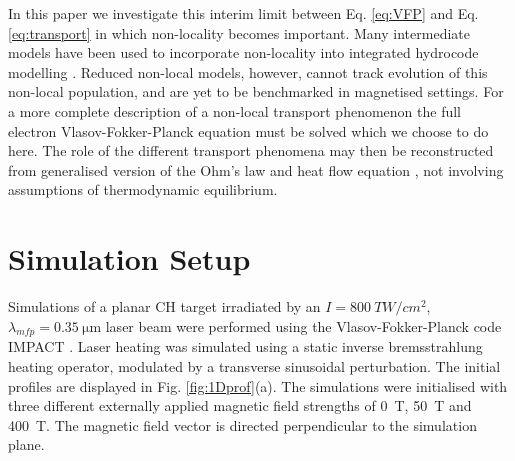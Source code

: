 \documentclass[aip,reprint]{revtex4-1}
\begin{document}
 In this paper we investigate this interim limit between Eq. \ref{eq:VFP} and Eq. \ref{eq:transport} in which non-locality becomes important. Many intermediate models have been used to incorporate non-locality into integrated hydrocode modelling \cite{Schurtz2000,Nicolai2006a,Manheimer2008}. Reduced non-local models, however, cannot track evolution of this non-local population, and are yet to be benchmarked in magnetised settings.  For a more complete description of a non-local transport phenomenon the full electron Vlasov-Fokker-Planck equation must be solved which we choose to do here.  The role of the different transport phenomena may then be reconstructed from generalised version of the Ohm's law and heat flow equation \cite{Luciani1983,Williams2013}, not involving assumptions of thermodynamic equilibrium. 


% 


\section{Simulation Setup}
\label{sec:simulationsetup}
Simulations of a planar CH target irradiated by an $I = \SI{800}{TW/cm^2}$, $\lambda_{mfp} = \SI{0.35}{\micro\meter}$ laser beam were performed using the Vlasov-Fokker-Planck code IMPACT \cite{Kingham2002}. Laser heating was simulated using a static inverse bremsstrahlung heating operator\cite{Langdon1980}, modulated by a transverse sinusoidal perturbation.  The initial profiles are displayed in Fig. \ref{fig:1Dprof}(a). The simulations were initialised with three different externally applied magnetic field strengths of  \SI{0}{T}, \SI{50}{T} and \SI{400}{T}. The magnetic field vector is directed perpendicular to the simulation plane.
\end{document}
